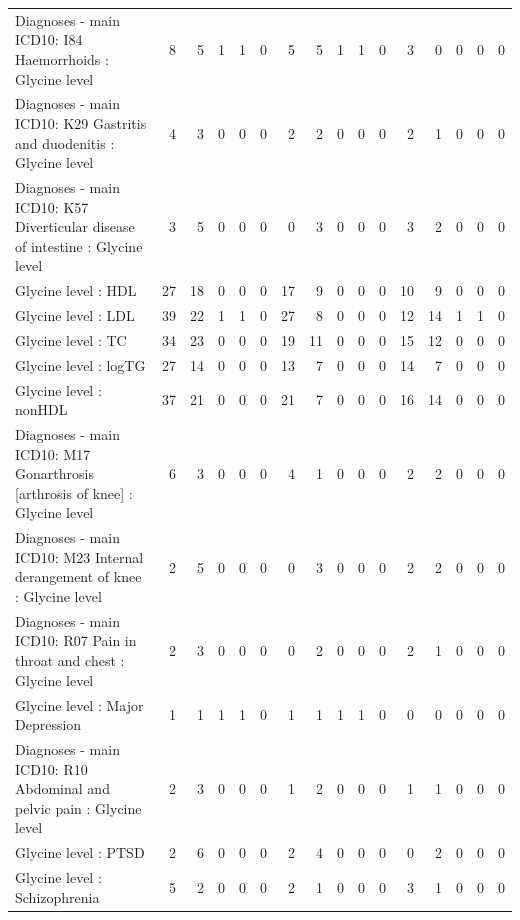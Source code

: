 \begin{table}[ht]
\begin{tabular}{lrrrrrrrrrrrrrrr}
  Diagnoses - main ICD10: I84 Haemorrhoids : Glycine level  &   8 &   5 &   1 &   1 &   0 &   5 &   5 &   1 &   1 &   0 &   3 &   0 &   0 &   0 &   0 \\ 
  Diagnoses - main ICD10: K29 Gastritis and duodenitis : Glycine level  &   4 &   3 &   0 &   0 &   0 &   2 &   2 &   0 &   0 &   0 &   2 &   1 &   0 &   0 &   0 \\ 
  Diagnoses - main ICD10: K57 Diverticular disease of intestine : Glycine level  &   3 &   5 &   0 &   0 &   0 &   0 &   3 &   0 &   0 &   0 &   3 &   2 &   0 &   0 &   0 \\ 
  Glycine level  : HDL &  27 &  18 &   0 &   0 &   0 &  17 &   9 &   0 &   0 &   0 &  10 &   9 &   0 &   0 &   0 \\ 
  Glycine level  : LDL &  39 &  22 &   1 &   1 &   0 &  27 &   8 &   0 &   0 &   0 &  12 &  14 &   1 &   1 &   0 \\ 
  Glycine level  : TC &  34 &  23 &   0 &   0 &   0 &  19 &  11 &   0 &   0 &   0 &  15 &  12 &   0 &   0 &   0 \\ 
  Glycine level  : logTG &  27 &  14 &   0 &   0 &   0 &  13 &   7 &   0 &   0 &   0 &  14 &   7 &   0 &   0 &   0 \\ 
  Glycine level  : nonHDL &  37 &  21 &   0 &   0 &   0 &  21 &   7 &   0 &   0 &   0 &  16 &  14 &   0 &   0 &   0 \\ 
  Diagnoses - main ICD10: M17 Gonarthrosis [arthrosis of knee] : Glycine level  &   6 &   3 &   0 &   0 &   0 &   4 &   1 &   0 &   0 &   0 &   2 &   2 &   0 &   0 &   0 \\ 
  Diagnoses - main ICD10: M23 Internal derangement of knee : Glycine level  &   2 &   5 &   0 &   0 &   0 &   0 &   3 &   0 &   0 &   0 &   2 &   2 &   0 &   0 &   0 \\ 
  Diagnoses - main ICD10: R07 Pain in throat and chest : Glycine level  &   2 &   3 &   0 &   0 &   0 &   0 &   2 &   0 &   0 &   0 &   2 &   1 &   0 &   0 &   0 \\ 
  Glycine level  : Major Depression &   1 &   1 &   1 &   1 &   0 &   1 &   1 &   1 &   1 &   0 &   0 &   0 &   0 &   0 &   0 \\ 
  Diagnoses - main ICD10: R10 Abdominal and pelvic pain : Glycine level  &   2 &   3 &   0 &   0 &   0 &   1 &   2 &   0 &   0 &   0 &   1 &   1 &   0 &   0 &   0 \\ 
  Glycine level  : PTSD &   2 &   6 &   0 &   0 &   0 &   2 &   4 &   0 &   0 &   0 &   0 &   2 &   0 &   0 &   0 \\ 
  Glycine level  : Schizophrenia &   5 &   2 &   0 &   0 &   0 &   2 &   1 &   0 &   0 &   0 &   3 &   1 &   0 &   0 &   0 \\ 

\end{tabular}
\end{table}
